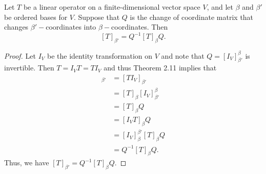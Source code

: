 \begin{theorem}
   Let \( T  \) be a linear operator on a finite-dimensional vector space \( V  \), and let \( \beta \) and \( \beta'  \) be ordered bases for \( V  \). Suppose that \( Q  \) is the change of coordinate matrix that changes \( \beta' - \)coordinates into \( \beta- \)coordinates. Then  
   \[  [T]_{\beta'} = Q^{-1} [T]_{\beta} Q. \]
\end{theorem}
\begin{proof}
Let \( {I}_{V}  \) be the identity transformation on \( V  \) and note that \( Q = [{I}_{V}]_{\beta'}^{\beta}  \) is invertible. Then \( T = {I}_{V}T = T {I}_{V}  \) and thus Theorem 2.11 implies that
\begin{align*}
    [T]_{\beta'} &= [T {I}_{V}]_{\beta'} \\
                 &=  [T]_{\beta} [{I}_{V}]_{\beta'}^{\beta}  \\
                 &= [T]_{\beta} Q \\
                 &= [{I}_{V} T ]_{\beta} Q \\
                 &= [{I}_{V}]_{\beta}^{\beta'} [T]_{\beta} Q  \\
                 &= Q^{-1} [T]_{\beta} Q.
\end{align*}
Thus, we have \( [T]_{\beta'} = Q^{-1} [T]_{\beta} Q \).
\end{proof}

